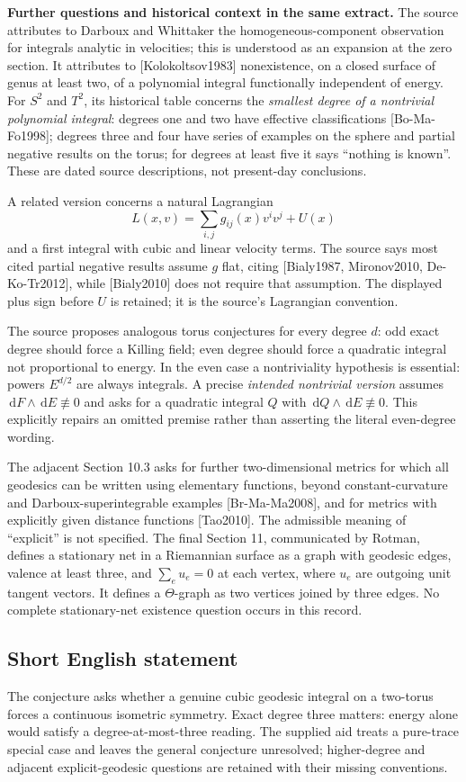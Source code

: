 \documentclass[11pt]{article}
\newcommand{\dd}{\,\mathrm{d}}
\begin{document}
\textbf{Further questions and historical context in the same extract.} The source attributes to Darboux and Whittaker the homogeneous-component observation for integrals analytic in velocities; this is understood as an expansion at the zero section. It attributes to [Kolokoltsov1983] nonexistence, on a closed surface of genus at least two, of a polynomial integral functionally independent of energy. For $S^2$ and $T^2$, its historical table concerns the \emph{smallest degree of a nontrivial polynomial integral}: degrees one and two have effective classifications [Bo-Ma-Fo1998]; degrees three and four have series of examples on the sphere and partial negative results on the torus; for degrees at least five it says ``nothing is known''. These are dated source descriptions, not present-day conclusions.

A related version concerns a natural Lagrangian
\[
 L(x,v)=\sum_{i,j}g_{ij}(x)v^iv^j+U(x)
\]
and a first integral with cubic and linear velocity terms. The source says most cited partial negative results assume $g$ flat, citing [Bialy1987, Mironov2010, De-Ko-Tr2012], while [Bialy2010] does not require that assumption. The displayed plus sign before $U$ is retained; it is the source's Lagrangian convention.

The source proposes analogous torus conjectures for every degree $d$: odd exact degree should force a Killing field; even degree should force a quadratic integral not proportional to energy. In the even case a nontriviality hypothesis is essential: powers $E^{d/2}$ are always integrals. A precise \emph{intended nontrivial version} assumes $\dd F\wedge\dd E\not\equiv0$ and asks for a quadratic integral $Q$ with $\dd Q\wedge\dd E\not\equiv0$. This explicitly repairs an omitted premise rather than asserting the literal even-degree wording.

The adjacent Section 10.3 asks for further two-dimensional metrics for which all geodesics can be written using elementary functions, beyond constant-curvature and Darboux-superintegrable examples [Br-Ma-Ma2008], and for metrics with explicitly given distance functions [Tao2010]. The admissible meaning of ``explicit'' is not specified. The final Section 11, communicated by Rotman, defines a stationary net in a Riemannian surface as a graph with geodesic edges, valence at least three, and $\sum_e u_e=0$ at each vertex, where $u_e$ are outgoing unit tangent vectors. It defines a $\Theta$-graph as two vertices joined by three edges. No complete stationary-net existence question occurs in this record.
\subsection{Short English statement}
The conjecture asks whether a genuine cubic geodesic integral on a two-torus forces a continuous isometric symmetry. Exact degree three matters: energy alone would satisfy a degree-at-most-three reading. The supplied aid treats a pure-trace special case and leaves the general conjecture unresolved; higher-degree and adjacent explicit-geodesic questions are retained with their missing conventions.
\end{document}
